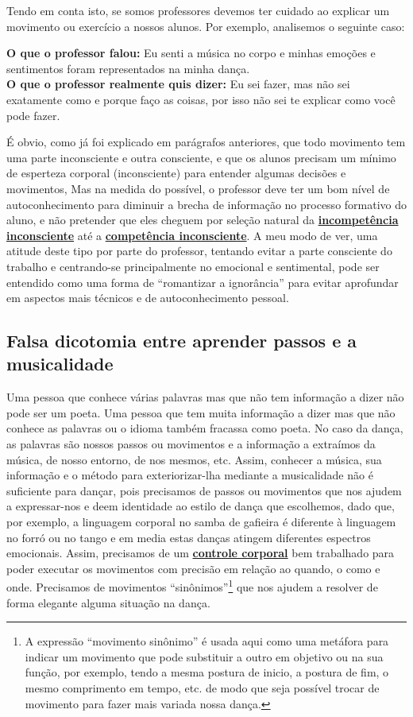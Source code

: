 Tendo em conta isto, se somos professores devemos ter cuidado ao explicar 
um movimento ou exercício a nossos alunos. 
Por exemplo, analisemos o seguinte caso:
\begin{citando}%
\textbf{O que o professor falou:} Eu senti a música no corpo e 
minhas emoções e sentimentos foram representados na minha dança.\\
\textbf{O que o professor realmente quis dizer:} Eu sei fazer, 
mas não sei exatamente como e porque faço as coisas, 
por isso não sei te explicar como você pode fazer.
\end{citando}
É obvio, como já foi explicado em parágrafos anteriores,
que todo movimento tem uma parte inconsciente e outra consciente,
e que os alunos precisam um mínimo de esperteza corporal (inconsciente) 
para entender algumas decisões e movimentos,
Mas na medida do possível, o professor deve ter um bom nível de autoconhecimento 
para diminuir a brecha de informação no processo formativo do aluno,
e não pretender que eles cheguem por seleção natural da 
\hyperref[ref:IncompetenciaInconsciente]{\textbf{incompetência inconsciente}}
até a \hyperref[ref:CompetenciaInconsciente]{\textbf{competência inconsciente}}.
A meu modo de ver, uma atitude deste tipo por parte do professor, tentando evitar a parte consciente do trabalho 
e centrando-se principalmente no emocional e sentimental,   
pode ser entendido como uma forma de ``romantizar a ignorância'' 
para evitar aprofundar em aspectos mais técnicos
e de autoconhecimento pessoal.


\subsection{Falsa dicotomia entre aprender passos e a musicalidade}
\label{ref:pasosvsmusicalidade}
Uma pessoa que conhece várias palavras mas que não tem informação a dizer não pode ser um poeta.
Uma pessoa que tem muita informação a dizer mas que não conhece as palavras ou o idioma também fracassa como poeta. 
No caso da dança, as palavras são nossos passos ou movimentos e a informação 
a extraímos da música, de nosso entorno, de nos mesmos, etc. Assim,
conhecer a música, sua informação e o método para exteriorizar-lha mediante a musicalidade 
não é suficiente para dançar, 
pois precisamos de passos ou movimentos que nos ajudem a expressar-nos e deem identidade ao estilo de dança que escolhemos,
dado que, por exemplo, a linguagem corporal no samba de gafieira é diferente à linguagem no forró ou no tango
e em media estas danças atingem diferentes espectros emocionais.
Assim, precisamos de um \hyperref[sec:BodyControl]{\textbf{controle corporal}} 
bem trabalhado para poder executar os movimentos com precisão em relação ao
quando, o como e onde. 
Precisamos de movimentos ``sinônimos''\footnote{A 
expressão ``movimento sinônimo'' é usada aqui como uma metáfora para indicar um movimento
que pode substituir a outro em objetivo ou na sua função, por exemplo, tendo
a mesma postura de inicio, a postura de fim, o mesmo comprimento em tempo, etc.
de modo que seja possível trocar de movimento para fazer mais variada nossa dança.} 
que nos ajudem a resolver de forma elegante alguma situação na dança.

